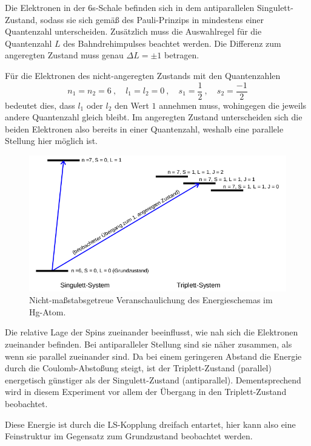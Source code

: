 Die Elektronen in der 6s-Schale befinden sich in dem antiparallelen Singulett-Zustand, sodass sie sich gemäß des Pauli-Prinzips 
in mindestens einer Quantenzahl unterscheiden. 
Zusätzlich muss die Auswahlregel für die Quantenzahl $L$ des Bahndrehimpulses beachtet werden. 
Die Differenz zum angeregten Zustand muss genau $\Delta L=\pm 1$ betragen. 

Für die Elektronen des nicht-angeregten Zustands mit den Quantenzahlen 
\begin{equation*}
    n_1=n_2=6\:,\quad l_1=l_2=0\:,\quad s_1=\frac{1}{2}\:,\quad s_2=\frac{-1}{2}
\end{equation*}
bedeutet dies, dass $l_1$ oder $l_2$ den Wert $1$ annehmen muss, wohingegen die jeweils andere Quantenzahl gleich bleibt. 
Im angeregten Zustand unterscheiden sich die beiden Elektronen also bereits in einer Quantenzahl, weshalb eine parallele Stellung 
hier möglich ist. 

\begin{figure}
    \centering
    \includegraphics[width=\textwidth]{plots/Energieschema.png}
    \caption{Nicht-maßstabsgetreue Veranschaulichung des Energieschemas im Hg-Atom\cite{Versuchsanleitung}.}
    \label{fig:Energieschema}
\end{figure}

Die relative Lage der Spins zueinander beeinflusst, wie nah sich die Elektronen zueinander befinden. Bei antiparalleler Stellung 
sind sie näher zusammen, als wenn sie parallel zueinander sind. 
Da bei einem geringeren Abstand die Energie durch die Coulomb-Abstoßung steigt, ist der Triplett-Zustand (parallel) energetisch 
günstiger als der Singulett-Zustand (antiparallel).
Dementsprechend wird in diesem Experiment vor allem der Übergang in den Triplett-Zustand beobachtet. 

Diese Energie ist durch die LS-Kopplung dreifach entartet, hier kann also eine Feinstruktur im Gegensatz zum Grundzustand beobachtet werden. 

